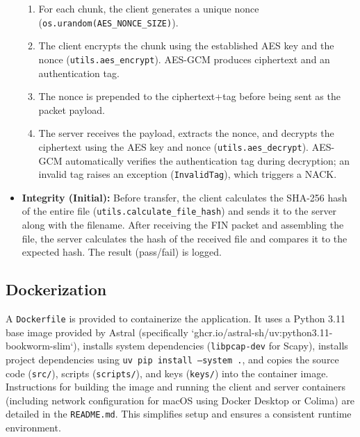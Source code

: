 \documentclass[11pt]{article}
\begin{document}
\begin{itemize}
        \begin{enumerate}
            \item For each chunk, the client generates a unique nonce (\texttt{os.urandom(AES\_NONCE\_SIZE)}).
            \item The client encrypts the chunk using the established AES key and the nonce (\texttt{utils.aes\_encrypt}). AES-GCM produces ciphertext and an authentication tag.
            \item The nonce is prepended to the ciphertext+tag before being sent as the packet payload.
            \item The server receives the payload, extracts the nonce, and decrypts the ciphertext using the AES key and nonce (\texttt{utils.aes\_decrypt}). AES-GCM automatically verifies the authentication tag during decryption; an invalid tag raises an exception (\texttt{InvalidTag}), which triggers a NACK.
        \end{enumerate}
    \item \textbf{Integrity (Initial):} Before transfer, the client calculates the SHA-256 hash of the entire file (\texttt{utils.calculate\_file\_hash}) and sends it to the server along with the filename. After receiving the FIN packet and assembling the file, the server calculates the hash of the received file and compares it to the expected hash. The result (pass/fail) is logged.
\end{itemize}

\subsection{Dockerization}
\label{sec:docker}
A \texttt{Dockerfile} is provided to containerize the application. It uses a Python 3.11 base image provided by Astral (specifically `ghcr.io/astral-sh/uv:python3.11-bookworm-slim`), installs system dependencies (\texttt{libpcap-dev} for Scapy), installs project dependencies using \texttt{uv pip install --system .}, and copies the source code (\texttt{src/}), scripts (\texttt{scripts/}), and keys (\texttt{keys/}) into the container image. Instructions for building the image and running the client and server containers (including network configuration for macOS using Docker Desktop or Colima) are detailed in the \texttt{README.md}. This simplifies setup and ensures a consistent runtime environment.
\end{document}
